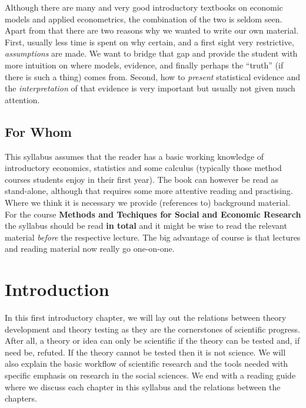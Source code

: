 \documentclass[
]{book}
\begin{document}
Although there are many and very good introductory textbooks on economic models and applied econometrics, the combination of the two is seldom seen. Apart from that there are two reasons why we wanted to write our own material. First, usually less time is spent on why certain, and a first sight very restrictive, \emph{assumptions} are made. We want to bridge that gap and provide the student with more intuition on where models, evidence, and finally perhaps the ``truth'' (if there is such a thing) comes from. Second, how to \emph{present} statistical evidence and the \emph{interpretation} of that evidence is very important but usually not given much attention.

\hypertarget{for-whom}{%
\section*{For Whom}\label{for-whom}}

This syllabus assumes that the reader has a basic working knowledge of introductory economics, statistics and some calculus (typically those method courses students enjoy in their first year). The book can however be read as stand-alone, although that requires some more attentive reading and practising. Where we think it is necessary we provide (references to) background material. For the course \textbf{Methods and Techiques for Social and Economic Research} the syllabus should be read \textbf{in total} and it might be wise to read the relevant material \emph{before} the respective lecture. The big advantage of course is that lectures and reading material now really go one-on-one.

\hypertarget{introduction}{%
\chapter{Introduction}\label{introduction}}

In this first introductory chapter, we will lay out the relations between theory development and theory testing as they are the cornerstones of scientific progress. After all, a theory or idea can only be scientific if the theory can be tested and, if need be, refuted. If the theory cannot be tested then it is not science. We will also explain the basic workflow of scientific research and the tools needed with specific emphasis on research in the social sciences. We end with a reading guide where we discuss each chapter in this syllabus and the relations between the chapters.
\end{document}
